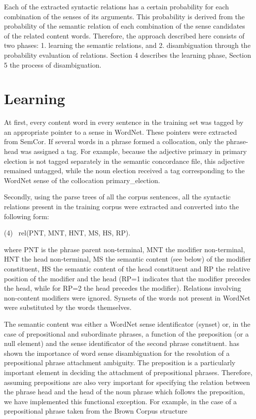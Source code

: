 Each of the extracted syntactic relations has a certain probability for each combination of the senses of its arguments. This probability is derived from the probability of the semantic relation of each combination of the sense candidates of the related content words. Therefore, the approach described here consists of two phases: 1. learning the semantic relations, and 2. disambiguation through the probability evaluation of relations. Section 4 describes the learning phase, Section 5 the process of disambiguation.

\section{Learning}
At first, every content word in every sentence in the training set was tagged by an appropriate pointer to a sense in WordNet. These pointers were extracted from SemCor. If several words in a phrase formed a collocation, only the phrase-head was assigned a tag. For example, because the adjective primary in primary election is not tagged separately in the semantic concordance file, this adjective remained untagged, while the noun election received a tag corresponding to the WordNet sense of the collocation primary\_election. 

Secondly, using the parse trees of all the corpus sentences, all the syntactic relations present in the training corpus were extracted and converted into the following form: 

\begin{center}
        (4) \,  rel(PNT, MNT, HNT, MS, HS, RP).  
\end{center}

\noindent
where PNT is the phrase parent non-terminal, MNT the modifier non-terminal, HNT the head non-terminal, MS the semantic content (see below) of the modifier constituent, HS the semantic content of the head constituent and RP the relative position of the modifier and the head (RP=1 indicates that the modifier precedes the head, while for RP=2 the head precedes the modifier). Relations involving non-content modifiers were ignored. Synsets of the words not present in WordNet were substituted by the words themselves. 

The semantic content was either a WordNet sense identificator (synset) or, in the case of prepositional and subordinate phrases, a function of the preposition (or a null element) and the sense identificator of the second phrase constituent. \cite{SN97} has shown the importance of word sense disambiguation for the resolution of a prepositional phrase attachment ambiguity. The preposition is a particularly important element in deciding the attachment of prepositional phrases. Therefore, assuming prepositions are also very important for specifying the relation between the phrase head and the head of the noun phrase which follows the preposition, we have implemented this functional exception. For example, in the case of a prepositional phrase taken from the Brown Corpus structure\\

